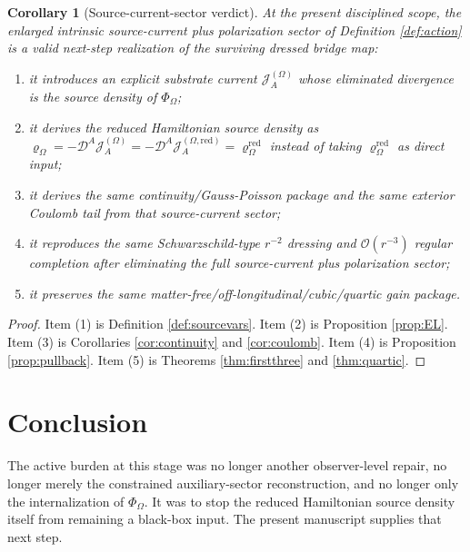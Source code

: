 \documentclass[11pt]{article}
\newcommand{\SpatialD}{\mathcal D}
\newcommand{\FlowPot}{\Phi_\Omega}
\newcommand{\SourceDensity}{\varrho_\Omega}
\newcommand{\SourceDensityRed}{\varrho_\Omega^{\mathrm{red}}}
\newcommand{\SourceCurrent}{\mathcal J^{(\Omega)}}
\newcommand{\SourceCurrentRed}{\mathcal J^{(\Omega,\mathrm{red})}}
\newtheorem{corollary}{Corollary}
\begin{document}
\begin{corollary}[Source-current-sector verdict]
\label{cor:verdict}
At the present disciplined scope, the enlarged intrinsic source-current plus polarization sector of Definition \ref{def:action} is a valid next-step realization of the surviving dressed bridge map:
\begin{enumerate}
    \item it introduces an explicit substrate current \(\SourceCurrent_A\) whose eliminated divergence is the source density of \(\FlowPot\);
    \item it derives the reduced Hamiltonian source density as \(\SourceDensity=-\SpatialD^A\SourceCurrent_A=-\SpatialD^A\SourceCurrentRed_A=\SourceDensityRed\) instead of taking \(\SourceDensityRed\) as direct input;
    \item it derives the same continuity/Gauss-Poisson package and the same exterior Coulomb tail from that source-current sector;
    \item it reproduces the same Schwarzschild-type \(r^{-2}\) dressing and \(\mathcal O(r^{-3})\) regular completion after eliminating the full source-current plus polarization sector;
    \item it preserves the same matter-free/off-longitudinal/cubic/quartic gain package.
\end{enumerate}
\end{corollary}

\begin{proof}
Item (1) is Definition \ref{def:sourcevars}. Item (2) is Proposition \ref{prop:EL}. Item (3) is Corollaries \ref{cor:continuity} and \ref{cor:coulomb}. Item (4) is Proposition \ref{prop:pullback}. Item (5) is Theorems \ref{thm:firstthree} and \ref{thm:quartic}.
\end{proof}

\section{Conclusion}

The active burden at this stage was no longer another observer-level repair, no longer merely the constrained auxiliary-sector reconstruction, and no longer only the internalization of \(\FlowPot\). It was to stop the reduced Hamiltonian source density itself from remaining a black-box input. The present manuscript supplies that next step.
\end{document}
